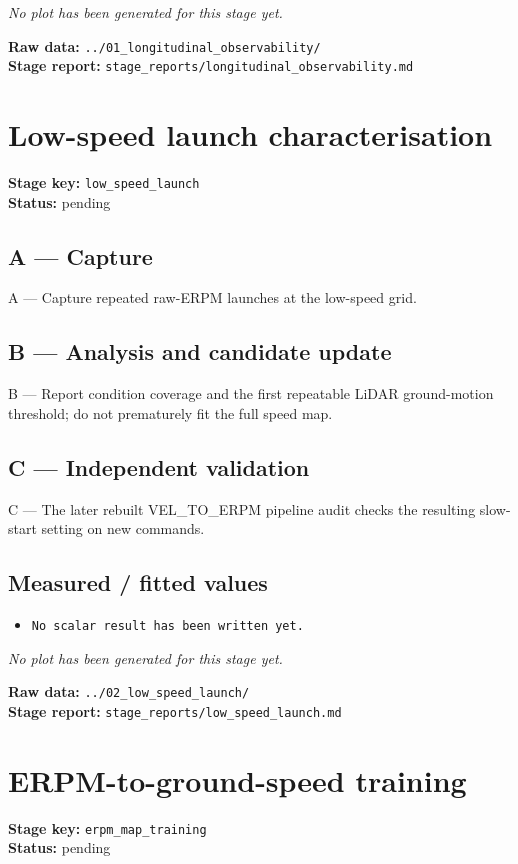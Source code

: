 \documentclass[11pt,a4paper]{article}
\begin{document}
\textit{No plot has been generated for this stage yet.}

\vfill
\textbf{Raw data:} \texttt{../01\_longitudinal\_observability/}\\
\textbf{Stage report:} \texttt{stage\_reports/longitudinal\_observability.md}
\clearpage
\small
\section*{Low-speed launch characterisation}
\textbf{Stage key:} \texttt{low\_speed\_launch}\\
\textbf{Status:} pending\\

\subsection*{A --- Capture}
A — Capture repeated raw-ERPM launches at the low-speed grid.

\subsection*{B --- Analysis and candidate update}
B — Report condition coverage and the first repeatable LiDAR ground-motion threshold; do not prematurely fit the full speed map.

\subsection*{C --- Independent validation}
C — The later rebuilt VEL\_TO\_ERPM pipeline audit checks the resulting slow-start setting on new commands.

\subsection*{Measured / fitted values}
\begin{itemize}\setlength\itemsep{0pt}
\item \texttt{No scalar result has been written yet.}
\end{itemize}

\textit{No plot has been generated for this stage yet.}

\vfill
\textbf{Raw data:} \texttt{../02\_low\_speed\_launch/}\\
\textbf{Stage report:} \texttt{stage\_reports/low\_speed\_launch.md}
\clearpage
\small
\section*{ERPM-to-ground-speed training}
\textbf{Stage key:} \texttt{erpm\_map\_training}\\
\textbf{Status:} pending\\
\end{document}
